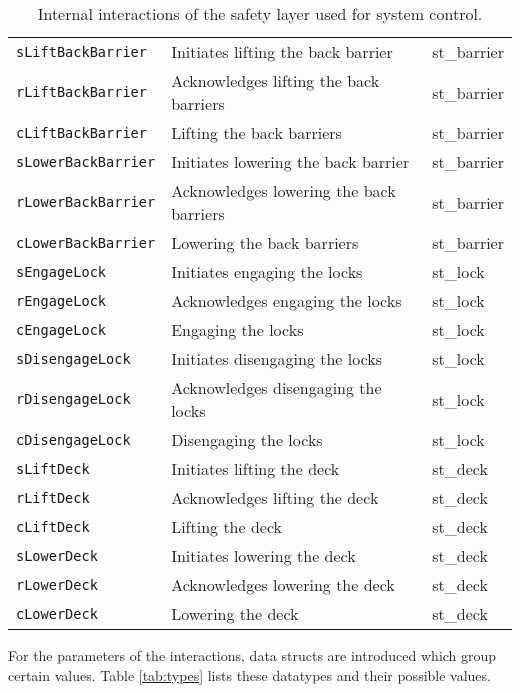 \begin{table}
\begin{tabular}{lll}
      \texttt{sLiftBackBarrier} & Initiates lifting the back barrier & st\_barrier\\
      \texttt{rLiftBackBarrier} & Acknowledges lifting the back barriers & st\_barrier\\
      \texttt{cLiftBackBarrier} & Lifting the back barriers & st\_barrier\\
      
      \texttt{sLowerBackBarrier} & Initiates lowering the back barrier & st\_barrier\\
      \texttt{rLowerBackBarrier} & Acknowledges lowering the back barriers & st\_barrier\\
      \texttt{cLowerBackBarrier} & Lowering the back barriers & st\_barrier\\
      
      \texttt{sEngageLock} & Initiates engaging the locks & st\_lock\\
      \texttt{rEngageLock} & Acknowledges engaging the locks & st\_lock\\
      \texttt{cEngageLock} & Engaging the locks & st\_lock\\
      
      \texttt{sDisengageLock} & Initiates disengaging the locks & st\_lock\\
      \texttt{rDisengageLock} & Acknowledges disengaging the locks & st\_lock\\
      \texttt{cDisengageLock} & Disengaging the locks & st\_lock\\
      
      \texttt{sLiftDeck} & Initiates lifting the deck & st\_deck\\
      \texttt{rLiftDeck} & Acknowledges lifting the deck & st\_deck\\
      \texttt{cLiftDeck} & Lifting the deck & st\_deck\\
      
      \texttt{sLowerDeck} & Initiates lowering the deck & st\_deck\\
      \texttt{rLowerDeck} & Acknowledges lowering the deck & st\_deck\\
      \texttt{cLowerDeck} & Lowering the deck & st\_deck\\
\end{tabular}
\caption{Internal interactions of the safety layer used for system control.}
\label{tab:tau}
\end{table}
%
For the parameters of the interactions, data structs are introduced which group certain values. Table \ref{tab:types} lists these datatypes and their possible values.


